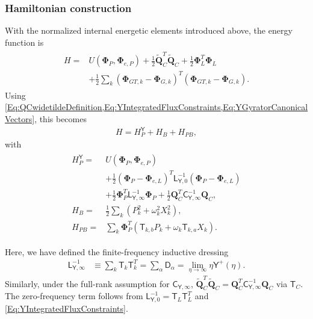 \documentclass[prx,aps,twocolumn,article]{revtex4-2}
\newcommand{\msf}[1]{\mathsf{#1}}
\newcommand{\bsb}[1]{\boldsymbol{#1}}
\newcommand{\bPhi}{\bsb{\Phi}}
\newcommand{\bQ}{\bsb{Q}}
\newcommand{\msT}{\msf{T}}
\newcommand{\msY}{\msf{Y}}
\newcommand{\msL}{\msf{L}}
\newcommand{\msC}{\msf{C}}
\newcommand{\msD}{\msf{D}}
\begin{document}
\subsubsection{Hamiltonian construction}

With the normalized internal energetic elements introduced above, the
energy function is
\begin{align}
\begin{aligned}
    H
    ={}&
    U(\bPhi_P,\bPhi_{e,P})
    +
    \frac{1}{2}
    \tilde{\bQ}_C^T
    \tilde{\bQ}_C
    +
    \frac{1}{2}
    \bPhi_L^T
    \bPhi_L
    \\
    &+
    \frac{1}{2}
    \sum_k
    \left(
        \bPhi_{GT,k}
        -
        \bPhi_{G,k}
    \right)^T
    \left(
        \bPhi_{GT,k}
        -
        \bPhi_{G,k}
    \right).
\end{aligned}
\label{Eq:YOriginalEnergy}
\end{align}
Using \cref{Eq:QCwidetildeDefinition,Eq:YIntegratedFluxConstraints,Eq:YGyratorCanonicalVectors}, this becomes
\begin{align}
    H
    =
    H_P^\msY
    +
    H_B
    +
    H_{PB},
\end{align}
with
\begin{align}
\begin{aligned}
    H_P^\msY
    ={}&
    U(\bPhi_P,\bPhi_{e,P})
    \\
    &+
    \frac{1}{2}
    \left(
        \bPhi_P-\bPhi_{e,L}
    \right)^T
    \msL_{\msY,0}^{-1}
    \left(
        \bPhi_P-\bPhi_{e,L}
    \right)
    \\
    &+
    \frac{1}{2}
    \bPhi_P^T
    \msL_{\msY,\infty}^{-1}
    \bPhi_P
    +
    \frac{1}{2}
    \bQ_C^T
    \msC_{\msY,\infty}^{-1}
    \bQ_C,
    \\
    H_B
    ={}&
    \frac{1}{2}
    \sum_k
    \left(
        P_k^2
        +
        \omega_k^2X_k^2
    \right),
    \\
    H_{PB}
    ={}&
    \sum_k
    \bPhi_P^T
    \left(
        \msT_{k,b}P_k
        +
        \omega_k
        \msT_{k,a}X_k
    \right).
\end{aligned}
\label{Eq:YExternalHamiltonianDiscrete}
\end{align}

Here, we have defined the finite-frequency inductive dressing
\begin{align}
    \msL_{\msY,\infty}^{-1}
    &\equiv
    \sum_k
    \msT_k\msT_k^T
    =
    \sum_\alpha
    \msD_\alpha
    =
    \lim_{\eta\rightarrow\infty}
    \eta\msY^+(\eta).
    \label{Eq:YHighFreqInductance}
\end{align}
Similarly, under the full-rank assumption for
$\msC_{\msY,\infty}$,
$\tilde{\bQ}_C^T\tilde{\bQ}_C
=
\bQ_C^T\msC_{\msY,\infty}^{-1}\bQ_C$
via $\msT_C$. The zero-frequency term follows from
$\msL_{\msY,0}^{-1}=\msT_L\msT_L^T$ and
\cref{Eq:YIntegratedFluxConstraints}.
\end{document}
